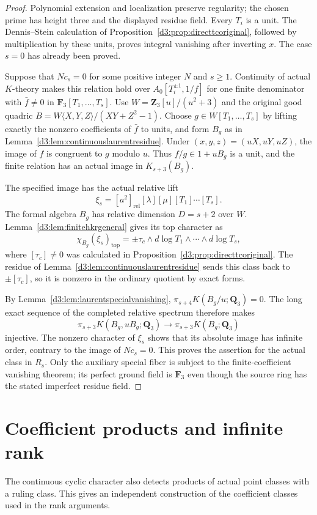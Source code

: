 \documentclass[11pt,a4paper]{amsart}
\numberwithin{equation}{section}
\theoremstyle{definition}
\theoremstyle{remark}
\newcommand{\Q}{\mathbf Q}
\newcommand{\Z}{\mathbf Z}
\newcommand{\F}{\mathbf F}
\begin{document}
\begin{proof}
Polynomial extension and localization preserve regularity; the
chosen prime has height three and the displayed residue field.
Every $T_i$ is a unit. The Dennis--Stein calculation of
Proposition~\ref{d3:prop:directtcoriginal}, followed by multiplication
by these units, proves integral vanishing after inverting $x$.
The case $s=0$ has already been proved.

Suppose that $N c_s=0$ for some positive integer $N$ and $s\geq1$.
Continuity of actual $K$-theory makes this relation hold over
$A_0[T_i^{\pm1},1/f]$ for one finite denominator with
$\bar f\ne0$ in $\F_3[T_1,\ldots,T_s]$.
Use $W=\Z_3[u]/(u^2+3)$ and the original good quadric
$B=W\langle X,Y,Z\rangle/(XY+Z^2-1)$.
Choose $g\in W[T_1,\ldots,T_s]$ by lifting exactly the nonzero
coefficients of $\bar f$ to units, and form $B_g$ as in
Lemma~\ref{d3:lem:continuouslaurentresidue}.
Under $(x,y,z)=(uX,uY,uZ)$, the image of $f$ is congruent to $g$
modulo $u$. Thus $f/g\in1+uB_g$ is a unit, and the finite
relation has an actual image in $K_{s+3}(B_g)$.

The specified image has the actual relative lift
\[
 \xi_s=[a^2]_{\mathrm{rel}}[\lambda][\mu]
                                  [T_1]\cdots[T_s].
\]
The formal algebra $B_g$ has relative dimension $D=s+2$ over $W$.
Lemma~\ref{d3:lem:finitehkrgeneral} gives its top character as
\[
 \chi_{B_g}(\xi_s)_{\mathrm{top}}
       =\pm\tau_c\wedge d\log T_1\wedge\cdots\wedge d\log T_s,
\]
where $[\tau_c]\ne0$ was calculated in
Proposition~\ref{d3:prop:directtcoriginal}.
The residue of Lemma~\ref{d3:lem:continuouslaurentresidue} sends this
class back to $\pm[\tau_c]$, so it is nonzero in the ordinary
quotient by exact forms.

By Lemma~\ref{d3:lem:laurentspecialvanishing},
$\pi_{s+4}K(B_g/u;\Q_3)=0$. The long exact sequence of the
completed relative spectrum therefore makes
\[
 \pi_{s+3}K(B_g,uB_g;\Q_3)
       \longrightarrow\pi_{s+3}K(B_g;\Q_3)
\]
injective. The nonzero character of $\xi_s$ shows that its absolute
image has infinite order, contrary to the image of $Nc_s=0$.
This proves the assertion for the actual class in $R_s$.
Only the auxiliary special fiber is subject to the finite-coefficient
vanishing theorem; its perfect ground field is $\F_3$ even though
the source ring has the stated imperfect residue field.
\end{proof}


\section{Coefficient products and infinite rank}
The continuous cyclic character also detects products of actual point
classes with a ruling class. This gives an independent construction
of the coefficient classes used in the rank arguments.
\end{document}
